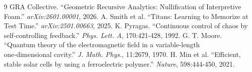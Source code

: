 \documentclass[12pt,a4paper]{article}
\begin{document}
\begin{thebibliography}{9}
 GRA Collective. ``Geometric Recursive Analytics: Nullification of Interpretive Foam.'' \textit{arXiv:2601.00001}, 2026.
 A. Smith et al. ``Titans: Learning to Memorize at Test Time.'' \textit{arXiv:2501.00663}, 2025.
 K. Pyragas. ``Continuous control of chaos by self‑controlling feedback.'' \textit{Phys. Lett. A}, 170:421-428, 1992.
 G. T. Moore. ``Quantum theory of the electromagnetic field in a variable‑length one‑dimensional cavity.'' \textit{J. Math. Phys.}, 11:2679, 1970.
 H. Min et al. ``Efficient, stable solar cells by using a ferroelectric polymer.'' \textit{Nature}, 598:444-450, 2021.
\end{thebibliography}
\end{document}
